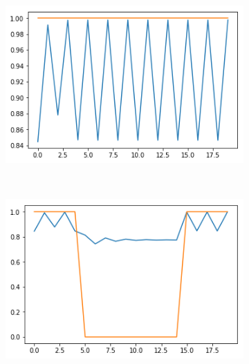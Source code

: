 \documentclass[12pt, letterpaper]{article}
\begin{document}
\begin{figure}[h]
    \centering
    \begin{subfigure}[b]{0.3\textwidth}
        \includegraphics[width=\textwidth]{of_f1}
        \label{fig:gull}
    \end{subfigure}
    ~ %
    \begin{subfigure}[b]{0.3\textwidth}
        \includegraphics[width=\textwidth]{of_f2}
        \label{fig:tiger}
    \end{subfigure}
    ~ %
    \begin{subfigure}[b]{0.3\textwidth}

\end{subfigure}
\end{figure}
\end{document}
